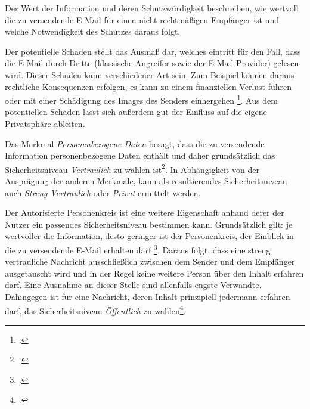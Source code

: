 \documentclass  [paper=a4,
				fontsize=12pt,
				listof=totoc,
				bibliography=totoc
				]{scrreprt}
\begin{document}
		Der Wert der Information und deren Schutzwürdigkeit beschreiben, wie wertvoll die zu versendende E-Mail für einen nicht rechtmäßigen Empfänger ist und welche Notwendigkeit des Schutzes daraus folgt.
		
		Der potentielle Schaden stellt das Ausmaß dar, welches eintritt für den Fall, dass die E-Mail durch 
		Dritte (klassische Angreifer sowie der E-Mail Provider) gelesen wird. Dieser Schaden kann verschiedener Art sein. Zum Beispiel können daraus rechtliche Konsequenzen erfolgen, es kann zu einem finanziellen Verlust führen oder mit einer Schädigung des Images des Senders einhergehen \footcite[Vgl.][]{Reinhausen GmbH, S. 6}. Aus dem potentiellen Schaden lässt sich außerdem gut der Einfluss auf die eigene Privatsphäre ableiten.
		
		
		Das Merkmal \textit{Personenbezogene Daten} besagt, dass die zu versendende Information personenbezogene Daten enthält und daher grundsätzlich das Sicherheitsniveau \textit{Vertraulich} zu wählen ist\footcite[Vgl.][]{TSE}.	In Abhängigkeit von der Ausprägung der anderen Merkmale, kann als resultierendes Sicherheitsniveau auch \textit{Streng Vertraulich} oder \textit{Privat} ermittelt werden.
		
		
		Der Autorisierte Personenkreis ist eine weitere Eigenschaft anhand derer der Nutzer ein passendes Sicherheitsniveau bestimmen kann. Grundsätzlich gilt: je wertvoller die Information, desto geringer ist der Personenkreis, der Einblick in die zu versendende E-Mail erhalten darf \footcite[Vgl.][]{TSE}. Daraus folgt, dass eine streng vertrauliche Nachricht ausschließlich zwischen dem Sender und dem Empfänger ausgetauscht wird und in der Regel keine weitere Person über den Inhalt erfahren darf. Eine Ausnahme an dieser Stelle sind allenfalls engste Verwandte. Dahingegen ist für eine Nachricht, deren Inhalt prinzipiell jedermann erfahren darf, das Sicherheitsniveau \textit{Öffentlich} zu wählen\footcite[Vgl.][]{Reinhausen GmbH, S. 10}.
		
\end{document}
